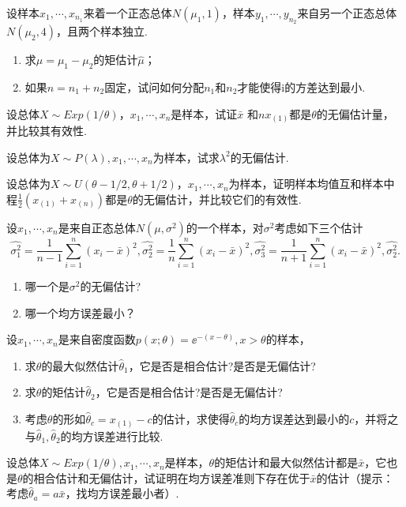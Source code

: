 \begin{xiti}
  \item 设样本$x_1,\cdots,x_{n_1}$来着一个正态总体$N(\mu_1,1)$，样本$y_1,\cdots,y_{n_2}$来自另一个正态总体$N(\mu_2,4)$，且两个样本独立.
      \begin{enumerate}
        \item 求$\mu=\mu_1-\mu_2$的矩估计$\hat\mu$；
        \item 如果$n=n_1+n_2$固定，试问如何分配$n_1$和$n_2$才能使得i的方差达到最小.
      \end{enumerate}

  \item 设总体$X\sim Exp(1/\theta)$，$x_1,\cdots,x_n$是样本，试证$\bar x$ 和$nx_{(1)}$都是$\theta$的无偏估计量，并比较其有效性.

  \item 设总体为$X\sim P(\lambda),x_1,\cdots,x_n$为样本，试求$\lambda^2$的无偏估计.

  \item 设总体为$X\sim U(\theta-1/2,\theta+1/2)$，$x_1,\cdots,x_n$为样本，证明样本均值互和样本中程$\frac12(x_{(1)}+x_{(n)})$都是$\theta$的无偏估计，并比较它们的有效性.

  \item 设$x_1,\cdots,x_n$是来自正态总体$N(\mu,\sigma^2)$的一个样本，对$\sigma^2$考虑如下三个估计
      \[
        \hat{\sigma_1^2} = \frac1{n-1}\sum_{i=1}^n(x_i-\bar x)^2,\hat{\sigma_2^2} = \frac1n\sum_{i=1}^n(x_i-\bar x)^2, \hat{\sigma_3^2} = \frac1{n+1}\sum_{i=1}^n(x_i-\bar x)^2,\hat{\sigma_2^2}.
      \]
      \begin{enumerate}
        \item 哪一个是$\sigma^2$的无偏估计?
        \item 哪一个均方误差最小？
      \end{enumerate}

  \item 设$x_1,\cdots,x_n$是来自密度函数$p(x;\theta)=\ee^{-(x-\theta)},x>\theta$的样本，
      \begin{enumerate}
        \item 求$\theta$的最大似然估计$\hat\theta_1$，它是否是相合估计?是否是无偏估计?
        \item 求$\theta$的矩估计$\hat\theta_2$，它是否是相合估计?是否是无偏估计?
        \item 考虑$\theta$的形如$\hat\theta_c=x_{(1)}-c$的估计，求使得$\hat\theta_c$的均方误差达到最小的$c$，并将之与$\hat\theta_1,\hat\theta_2$的均方误差进行比较.
      \end{enumerate}

  \item 设总体$X\sim Exp(1/\theta),x_1,\cdots,x_n$是样本，$\theta$的矩估计和最大似然估计都是$\bar x$，它也是$\theta$的相合估计和无偏估计，试证明在均方误差准则下存在优于$\bar x$的估计（提示：考虑$\hat\theta_a=a\bar x$，找均方误差最小者）.
\end{xiti}

